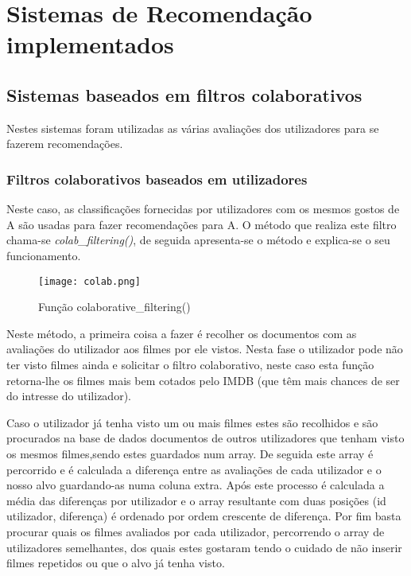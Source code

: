 \section{Sistemas de Recomendação implementados}


\subsection{Sistemas baseados em filtros colaborativos}

Nestes sistemas foram utilizadas as várias avaliações dos utilizadores para se fazerem recomendações. 

\subsubsection{Filtros colaborativos baseados em utilizadores}\hfill

Neste caso, as classificações fornecidas por utilizadores com os mesmos gostos de A são usadas para fazer recomendações para A.
O método que realiza este filtro chama-se \textit{colab\_filtering()}, de seguida apresenta-se o método e explica-se o seu funcionamento.

\begin{figure}[H]
\centering
\texttt{[image: colab.png]}
\caption {Função colaborative\_filtering()}
\label {fig01}
\end{figure}

Neste método, a primeira coisa a fazer é recolher os documentos com as avaliações do utilizador aos filmes por ele vistos. Nesta fase o utilizador pode não ter visto filmes ainda e solicitar o filtro colaborativo, neste caso esta função retorna-lhe os filmes mais bem cotados pelo IMDB (que têm mais chances de ser do intresse do utilizador).
\par Caso o utilizador já tenha visto um ou mais filmes estes são recolhidos e são procurados na base de dados documentos de outros utilizadores que tenham visto os mesmos filmes,sendo estes guardados num array. De seguida este array é percorrido e é calculada a diferença entre as avaliações de cada utilizador e o nosso alvo guardando-as numa coluna extra.
Após este processo é calculada a média das diferenças por utilizador e o array resultante com duas posições (id utilizador, diferença) é ordenado por ordem crescente de diferença.
Por fim basta procurar quais os filmes avaliados por cada utilizador, percorrendo o array de utilizadores semelhantes, dos quais estes gostaram tendo o cuidado de não inserir filmes repetidos ou que o alvo já tenha visto.

